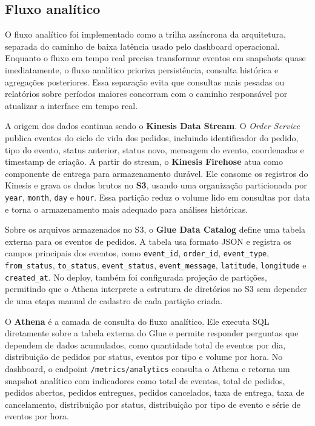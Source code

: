 ﻿\documentclass{article}
\begin{document}
\subsection{Fluxo anal\'itico}

O fluxo anal\'itico foi implementado como a trilha ass\'incrona da arquitetura, separada do caminho de baixa lat\^encia usado pelo dashboard operacional. Enquanto o fluxo em tempo real precisa transformar eventos em snapshots quase imediatamente, o fluxo anal\'itico prioriza persist\^encia, consulta hist\'orica e agrega\c{c}\~oes posteriores. Essa separa\c{c}\~ao evita que consultas mais pesadas ou relat\'orios sobre per\'iodos maiores concorram com o caminho respons\'avel por atualizar a interface em tempo real.

A origem dos dados continua sendo o \textbf{Kinesis Data Stream}. O \textit{Order Service} publica eventos do ciclo de vida dos pedidos, incluindo identificador do pedido, tipo do evento, status anterior, status novo, mensagem do evento, coordenadas e timestamp de cria\c{c}\~ao. A partir do stream, o \textbf{Kinesis Firehose} atua como componente de entrega para armazenamento dur\'avel. Ele consome os registros do Kinesis e grava os dados brutos no \textbf{S3}, usando uma organiza\c{c}\~ao particionada por \texttt{year}, \texttt{month}, \texttt{day} e \texttt{hour}. Essa parti\c{c}\~ao reduz o volume lido em consultas por data e torna o armazenamento mais adequado para an\'alises hist\'oricas.

Sobre os arquivos armazenados no S3, o \textbf{Glue Data Catalog} define uma tabela externa para os eventos de pedidos. A tabela usa formato JSON e registra os campos principais dos eventos, como \texttt{event\_id}, \texttt{order\_id}, \texttt{event\_type}, \texttt{from\_status}, \texttt{to\_status}, \texttt{event\_status}, \texttt{event\_message}, \texttt{latitude}, \texttt{longitude} e \texttt{created\_at}. No deploy, tamb\'em foi configurada proje\c{c}\~ao de parti\c{c}\~oes, permitindo que o Athena interprete a estrutura de diret\'orios no S3 sem depender de uma etapa manual de cadastro de cada parti\c{c}\~ao criada.

O \textbf{Athena} \'e a camada de consulta do fluxo anal\'itico. Ele executa SQL diretamente sobre a tabela externa do Glue e permite responder perguntas que dependem de dados acumulados, como quantidade total de eventos por dia, distribui\c{c}\~ao de pedidos por status, eventos por tipo e volume por hora. No dashboard, o endpoint \texttt{/metrics/analytics} consulta o Athena e retorna um snapshot anal\'itico com indicadores como total de eventos, total de pedidos, pedidos abertos, pedidos entregues, pedidos cancelados, taxa de entrega, taxa de cancelamento, distribui\c{c}\~ao por status, distribui\c{c}\~ao por tipo de evento e s\'erie de eventos por hora.
\end{document}
